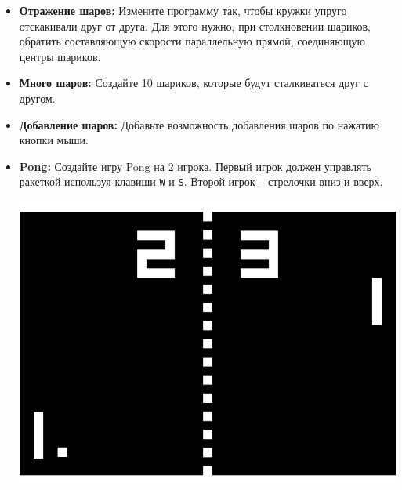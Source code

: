 \documentclass{article}
\begin{document}
\begin{itemize}
\item \textbf{Отражение шаров:} Измените программу так, чтобы кружки упруго отскакивали друг от друга. Для этого нужно, при столкновении шариков, обратить составляющую скорости параллельную прямой, соединяющую центры шариков.
\item \textbf{Много шаров:} Создайте 10 шариков, которые будут сталкиваться друг с другом.
\item \textbf{Добавление шаров:} Добавьте возможность добавления шаров по нажатию кнопки мыши.
\item \textbf{Pong:} Создайте игру Pong на 2 игрока. Первый игрок должен управлять ракеткой используя клавиши \texttt{W} и \texttt{S}. Второй игрок -- стрелочки вниз и вверх.
\begin{center}
\includegraphics[scale=0.5]{../images/pong.png}
\end{center}
\end{itemize}
\end{document}
